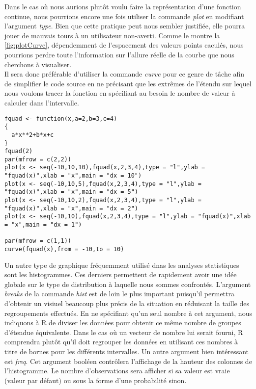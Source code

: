 \vspace{\baselineskip}
\noindent
Dans le cas où nous aurions plutôt voulu faire la représentation d'une fonction continue, nous pourrions encore une fois utiliser la commande \emph{plot} en modifiant l'argument \emph{type}. Bien que cette pratique peut nous sembler justifiée, elle pourra jouer de mauvais tours à un utilisateur non-averti. Comme le montre la \autoref{fig:plotCurve}, dépendemment de l'espacement des valeurs points caculés, nous pourrions perdre toute l'information sur l'allure réelle de la courbe que nous cherchons à visualiser. \\

\noindent
Il sera donc préférable d'utiliser la commande \emph{curve} pour ce genre de tâche afin de simplifier le code source en ne précisant que les extrêmes de l'étendu sur lequel nous voulons tracer la fonction en spécifiant au besoin le nombre de valeur à calculer dans l'intervalle. \\

\begin{lstlisting}[caption = Utilisation de la commande \emph{curve},label=src:plotCurve]
fquad <- function(x,a=2,b=3,c=4)
{
  a*x**2+b*x+c
}
fquad(2)
par(mfrow = c(2,2))
plot(x <- seq(-10,10,10),fquad(x,2,3,4),type = "l",ylab = "fquad(x)",xlab = "x",main = "dx = 10")
plot(x <- seq(-10,10,5),fquad(x,2,3,4),type = "l",ylab = "fquad(x)",xlab = "x",main = "dx = 5")
plot(x <- seq(-10,10,2),fquad(x,2,3,4),type = "l",ylab = "fquad(x)",xlab = "x",main = "dx = 2")
plot(x <- seq(-10,10),fquad(x,2,3,4),type = "l",ylab = "fquad(x)",xlab = "x",main = "dx = 1")

par(mfrow = c(1,1))
curve(fquad(x),from = -10,to = 10)
\end{lstlisting}



\vspace{\baselineskip}
\noindent
Un autre type de graphique fréquemment utilisé dnas les analyses statistiques sont les histogrammes. Ces derniers permettent de rapidement avoir une idée globale sur le type de distribution à laquelle nous sommes confrontés. L'argument \emph{breaks} de la commande \emph{hist} est de loin le plus important puisqu'il permettra d'obtenir un visiuel beaucoup plus précis de la situation en réduisant la taille des regroupements effectués. En ne spécifiant qu'un seul nombre à cet argument, nous indiquons à R de diviser les données pour obtenir ce même nombre de groupes d'étendue équivalente. Dans le cas où un vecteur de nombre lui serait fourni, R comprendra plutôt qu'il doit regrouper les données en utilisant ces nombres à titre de bornes pour les différents intervalles. Un autre argument bien intéressant est \emph{freq}. Cet argument booléen contrôlera l'affichage de la hauteur des colonnes de l'histogramme. Le nombre d'observations sera afficher si sa valeur est vraie (valeur par défaut) ou sous la forme d'une probabilité sinon. \\

